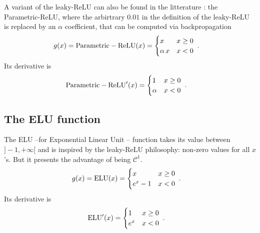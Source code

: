 A variant of the leaky-ReLU can also be found in the litterature : the Parametric-ReLU, where the arbirtrary $0.01$ in the definition of the leaky-ReLU is replaced by an $\alpha$ coefficient, that can be computed via backpropagation
\begin{align}
g(x)&={\rm Parametric-ReLU}(x)=\begin{cases} 
      x & x\geq 0 \\
      \alpha\,x & x<0 
   \end{cases}\;.
\end{align}
Its derivative is
\begin{align}
{\rm Parametric-ReLU}'(x)&=\begin{cases} 
      1 & x\geq 0 \\
      \alpha & x<0 
   \end{cases}\;.
\end{align}

\subsection{The ELU function}

The ELU --for Exponential Linear Unit -- function takes its value between $]-1,+\infty[$ and is inspired by the leaky-ReLU philosophy: non-zero values for all $x$'s. But it presents the advantage of being $\mathcal{C}^1$.
\begin{align}
g(x)&={\rm ELU}(x)=\begin{cases} 
      x & x\geq 0 \\
      e^x-1 & x<0 
   \end{cases}\;.
\end{align}
Its derivative is
\begin{align}
{\rm ELU}'(x)&=\begin{cases} 
      1 & x\geq 0 \\
      e^x & x<0 
   \end{cases}\;.
\end{align}


